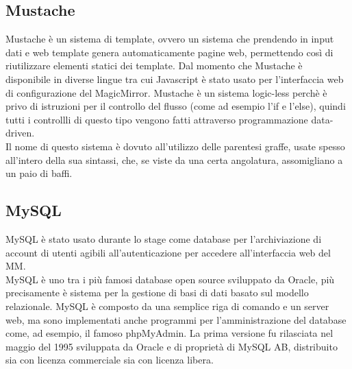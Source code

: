 \subsection{Mustache}\label{cap:mustache}
Mustache \`e un sistema di template, ovvero un sistema che prendendo in input dati e web template
genera automaticamente pagine web, permettendo cos\`i di riutilizzare elementi statici dei template.
Dal momento che Mustache \`e disponibile in diverse lingue tra cui Javascript \`e stato usato per l'interfaccia web di configurazione
del MagicMirror.
Mustache \`e un sistema logic-less perch\`e \`e privo di istruzioni per il controllo del flusso
(come ad esempio l'if e l'else), quindi tutti i controllli di questo tipo vengono fatti
attraverso programmazione data-driven.\\
Il nome di questo sistema \`e dovuto all'utilizzo delle parentesi graffe, usate spesso
all'intero della sua sintassi, che, se viste da una certa angolatura, assomigliano
a un paio di baffi.

\subsection{MySQL}
MySQL \`e stato usato durante lo stage come database per l'archiviazione di account di utenti
agibili all'autenticazione per accedere all'interfaccia web del MM.\\
MySQL \`e uno tra i pi\`u famosi database open source sviluppato da Oracle, pi\`u precisamente
\`e sistema per la gestione di basi di dati basato sul modello relazionale.
MySQL \`e composto da una semplice riga di comando e un server web, ma sono implementati anche programmi
per l'amministrazione del database come, ad esempio, il famoso phpMyAdmin.
La prima versione fu rilasciata nel maggio del 1995 sviluppata da Oracle e di propriet\`a di MySQL AB,
distribuito sia con licenza commerciale sia con licenza libera.

